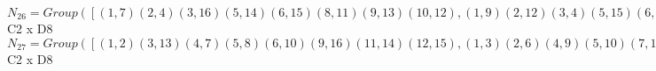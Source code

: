 \documentclass[varwidth=\maxdimen,border=10]{standalone}
\begin{document}
\begin{tabular}
$N_{26} = Group( [ ( 1, 7)( 2, 4)( 3,16)( 5,14)( 6,15)( 8,11)( 9,13)(10,12), ( 1, 9)( 2,12)( 3, 4)( 5,15)( 6, 7)( 8,16)(10,11)(13,14), ( 1, 5)( 2, 8)( 3,10)( 4,11)( 6,13)( 7,14)( 9,15)(12,16), ( 1, 2)( 3,13)( 4, 7)( 5, 8)( 6,10)( 9,16)(11,14)(12,15) ] )\cong$ C2 x D8\ \\
$N_{27} = Group( [ ( 1, 2)( 3,13)( 4, 7)( 5, 8)( 6,10)( 9,16)(11,14)(12,15), ( 1, 3)( 2, 6)( 4, 9)( 5,10)( 7,12)( 8,13)(11,15)(14,16), ( 1, 4)( 2, 7)( 3, 9)( 5,11)( 6,12)( 8,14)(10,15)(13,16), ( 1, 5)( 2, 8)( 3,10)( 4,11)( 6,13)( 7,14)( 9,15)(12,16) ] )\cong$ C2 x D8\end{tabular}
\end{document}
